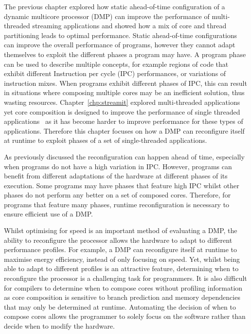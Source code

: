 The previous chapter explored how static ahead-of-time configuration of a dynamic multicore processor (DMP) can improve the performance of multi-threaded streaming applications and showed how a mix of core and thread partitioning leads to optimal performance.
Static ahead-of-time configurations can improve the overall performance of programs, however they cannot adapt themselves to exploit the different phases a program may have.
A program phase can be used to describe multiple concepts, for example regions of code that exhibit different Instruction per cycle (IPC) performances, or variations of instruction mixes.
When programs exhibit different phases of IPC, this can result in situations where composing multiple cores may be an inefficient solution, thus wasting resources.
Chapter~\ref{chp:streamit} explored multi-threaded applications yet core composition is designed to improve the performance of single threaded applications~\cite{ipek2007CoreFusion} as it has become harder to improve performance for these types of applications.
Therefore this chapter focuses on how a DMP can reconfigure itself at runtime to exploit phases of a set of single-threaded applications.

As previously discussed the reconfiguration can happen ahead of time, especially when programs do not have a high variation in IPC.
However, programs can benefit from different adaptations of the hardware at different phases of its execution.
Some programs may have phases that feature high IPC whilst other phases do not perform any better on a set of composed cores.
Therefore, for programs that feature many phases, runtime reconfiguration is necessary to ensure efficient use of a DMP.

Whilst optimising for speed is an important method of evaluating a DMP, the ability to reconfigure the processor allows the hardware to adapt to different performance profiles.
For example, a DMP can reconfigure itself at runtime to maximise energy efficiency, instead of only focusing on speed.
Yet, whilst being able to adapt to different profiles is an attractive feature, determining when to reconfigure the processor is a challenging task for programmers.
It is also difficult for compilers to determine when to compose cores without profiling information as core composition is sensitive to branch prediction and memory dependencies that may only be determined at runtime.%
Automating the decision of when to compose cores allows the programmer to solely focus on the software rather than decide when to modify the hardware.

